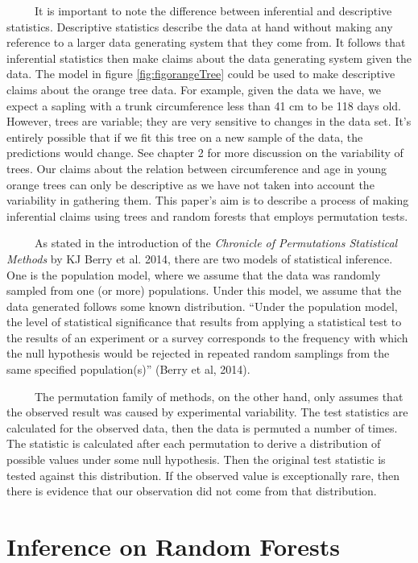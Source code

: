 \documentclass[12pt,twoside]{reedthesis}
\begin{document}
  ~~~~~It is important to note the difference between inferential and
  descriptive statistics. Descriptive statistics describe the data at hand
  without making any reference to a larger data generating system that
  they come from. It follows that inferential statistics then make claims
  about the data generating system given the data. The model in figure
  \ref{fig:figorangeTree} could be used to make descriptive claims about
  the orange tree data. For example, given the data we have, we expect a
  sapling with a trunk circumference less than 41 cm to be 118 days old.
  However, trees are variable; they are very sensitive to changes in the
  data set. It's entirely possible that if we fit this tree on a new
  sample of the data, the predictions would change. See chapter 2 for more
  discussion on the variability of trees. Our claims about the relation
  between circumference and age in young orange trees can only be
  descriptive as we have not taken into account the variability in
  gathering them. This paper's aim is to describe a process of making
  inferential claims using trees and random forests that employs
  permutation tests.
  
  ~~~~~As stated in the introduction of the \emph{Chronicle of
  Permutations Statistical Methods} by KJ Berry et al. 2014, there are two
  models of statistical inference. One is the population model, where we
  assume that the data was randomly sampled from one (or more)
  populations. Under this model, we assume that the data generated follows
  some known distribution. ``Under the population model, the level of
  statistical significance that results from applying a statistical test
  to the results of an experiment or a survey corresponds to the frequency
  with which the null hypothesis would be rejected in repeated random
  samplings from the same specified population(s)'' (Berry et al, 2014).
  
  ~~~~~The permutation family of methods, on the other hand, only assumes
  that the observed result was caused by experimental variability. The
  test statistics are calculated for the observed data, then the data is
  permuted a number of times. The statistic is calculated after each
  permutation to derive a distribution of possible values under some null
  hypothesis. Then the original test statistic is tested against this
  distribution. If the observed value is exceptionally rare, then there is
  evidence that our observation did not come from that distribution.
  
  \section{Inference on Random Forests}\label{inference-on-random-forests}
  
\end{document}
